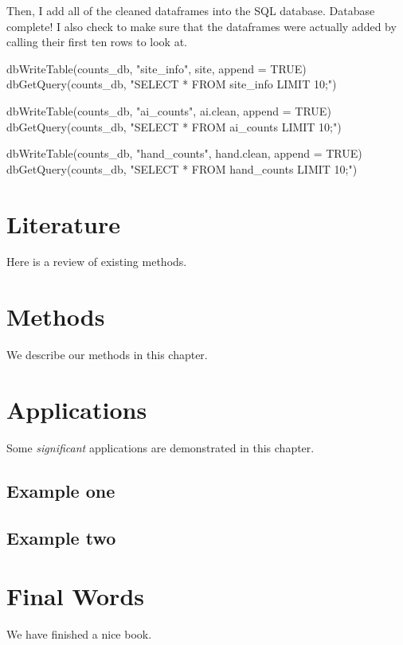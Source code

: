 \documentclass[
]{book}
\newenvironment{Shaded}{\begin{snugshade}}{\end{snugshade}}
\newcommand{\AttributeTok}[1]{\textcolor[rgb]{0.77,0.63,0.00}{#1}}
\newcommand{\ConstantTok}[1]{\textcolor[rgb]{0.00,0.00,0.00}{#1}}
\newcommand{\FunctionTok}[1]{\textcolor[rgb]{0.00,0.00,0.00}{#1}}
\newcommand{\NormalTok}[1]{#1}
\newcommand{\StringTok}[1]{\textcolor[rgb]{0.31,0.60,0.02}{#1}}
\begin{document}
Then, I add all of the cleaned dataframes into the SQL database. Database complete! I also check to make sure that the dataframes were actually added by calling their first ten rows to look at.

\begin{Shaded}
\begin{Highlighting}[]
\FunctionTok{dbWriteTable}\NormalTok{(counts\_db, }\StringTok{"site\_info"}\NormalTok{, site, }\AttributeTok{append =} \ConstantTok{TRUE}\NormalTok{)}
\FunctionTok{dbGetQuery}\NormalTok{(counts\_db, }\StringTok{"SELECT * FROM site\_info LIMIT 10;"}\NormalTok{)}

\FunctionTok{dbWriteTable}\NormalTok{(counts\_db, }\StringTok{"ai\_counts"}\NormalTok{, ai.clean, }\AttributeTok{append =} \ConstantTok{TRUE}\NormalTok{)}
\FunctionTok{dbGetQuery}\NormalTok{(counts\_db, }\StringTok{"SELECT * FROM ai\_counts LIMIT 10;"}\NormalTok{)}

\FunctionTok{dbWriteTable}\NormalTok{(counts\_db, }\StringTok{"hand\_counts"}\NormalTok{, hand.clean, }\AttributeTok{append =} \ConstantTok{TRUE}\NormalTok{)}
\FunctionTok{dbGetQuery}\NormalTok{(counts\_db, }\StringTok{"SELECT * FROM hand\_counts LIMIT 10;"}\NormalTok{)}
\end{Highlighting}
\end{Shaded}

\hypertarget{literature}{%
\chapter{Literature}\label{literature}}

Here is a review of existing methods.

\hypertarget{methods}{%
\chapter{Methods}\label{methods}}

We describe our methods in this chapter.

\hypertarget{applications}{%
\chapter{Applications}\label{applications}}

Some \emph{significant} applications are demonstrated in this chapter.

\hypertarget{example-one}{%
\section{Example one}\label{example-one}}

\hypertarget{example-two}{%
\section{Example two}\label{example-two}}

\hypertarget{final-words}{%
\chapter{Final Words}\label{final-words}}

We have finished a nice book.

  
\end{document}
